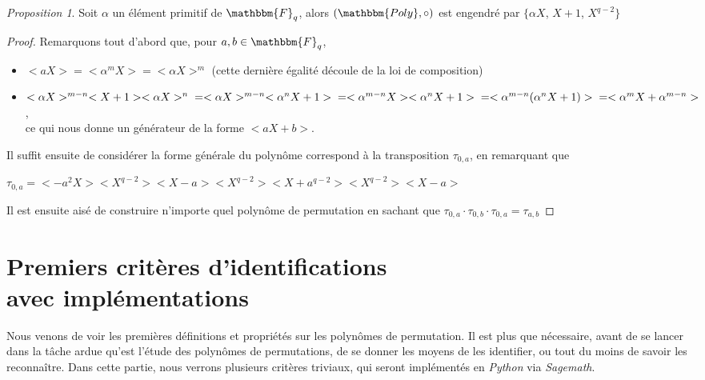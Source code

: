 \documentclass[12pt]{article}
\theoremstyle{remark}\newtheorem{note}{Note}
\theoremstyle{remark}\newtheorem{nota}{Notation}
\newcommand{\Fq}{\mathbbm{F}_q}
\newtheorem{prop}{Proposition}
\theoremstyle{definition}
\begin{document}
\begin{prop}
Soit $\alpha$ un élément primitif de $\Fq$, alors $(\mathbbm{Poly}, \circ)$ est engendré par $\{ \alpha X$, $X+1$, $X^{q-2}\}$
\end{prop}

\begin{proof}
Remarquons tout d'abord que, pour $a, b \in \Fq$, 
	\begin{itemize}
		\item $<aX> = <\alpha^mX> = <\alpha X>^m$ (cette dernière égalité découle de la loi de composition)
		\item $<\alpha X>^{m-n}<X+1><\alpha X>^n \newline
		= <\alpha X>^{m-n}<\alpha^nX + 1> \newline
		= <\alpha^{m-n} X ><\alpha^n X+ 1> \newline
		= <\alpha^{m-n}(\alpha^n X+ 1)> \newline
		= <\alpha^mX+\alpha^{m-n}>$,\\
ce qui nous donne un générateur de la forme $<aX + b>$.
	\end{itemize}
Il suffit ensuite de considérer la forme générale du polynôme correspond à la transposition $\tau_{0,a}$, en remarquant que 
\begin{center} $\tau_{0,a} = <-a^2X><X^{q-2}><X-a><X^{q-2}><X+a^{q-2}><X^{q-2}><X-a>$ \end{center}
Il est ensuite aisé de construire n'importe quel polynôme de permutation en sachant que $\tau_{0,a} \cdot \tau_{0,b} \cdot \tau_{0,a} = \tau_{a,b}$
\end{proof}


\pagebreak

\section{Premiers critères d'identifications\\avec implémentations}
Nous venons de voir les premières définitions et propriétés sur les polynômes de permutation. Il est plus que nécessaire, avant de se lancer dans la tâche ardue qu'est l'étude des polynômes de permutations, de se donner les moyens de les identifier, ou tout du moins de savoir les reconnaître. 
Dans cette partie, nous verrons plusieurs critères triviaux, qui seront implémentés en \textit{Python} via \textit{Sagemath}.
\end{document}
